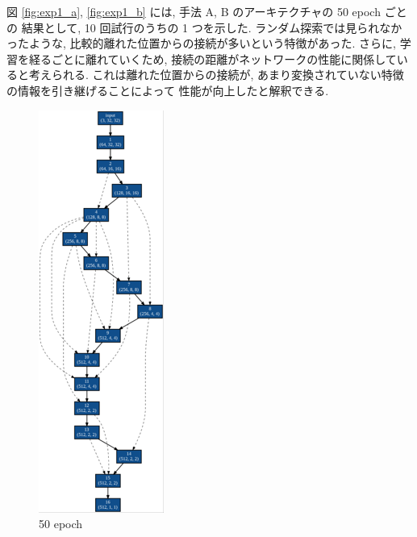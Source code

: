 図 \ref{fig:exp1_a}, \ref{fig:exp1_b} には, 手法 A, B のアーキテクチャの 50 epoch ごとの
結果として, 10 回試行のうちの 1 つを示した.
ランダム探索では見られなかったような, 比較的離れた位置からの接続が多いという特徴があった.
さらに, 学習を経るごとに離れていくため, 接続の距離がネットワークの性能に関係していると考えられる.
これは離れた位置からの接続が, あまり変換されていない特徴の情報を引き継げることによって
性能が向上したと解釈できる.



\begin{figure}[tb]
 \begin{minipage}{0.3\hsize}
 	\begin{center}
 		\includegraphics[clip,scale=0.8]{./fig/04.exp/a50.png}\\
 		50 epoch
 	\end{center}
 \end{minipage}
 \begin{minipage}{0.3\hsize}
 	\begin{center}

\end{center}
\end{minipage}
\end{figure}
